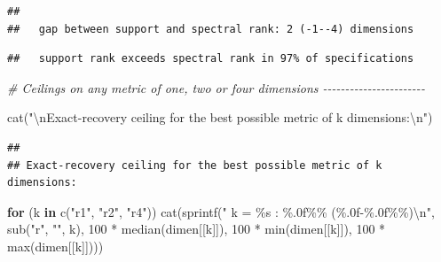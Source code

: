 \documentclass[
  11pt,
]{article}
\newenvironment{Shaded}{\begin{snugshade}}{\end{snugshade}}
\newcommand{\CommentTok}[1]{\textcolor[rgb]{0.56,0.35,0.01}{\textit{#1}}}
\newcommand{\ControlFlowTok}[1]{\textcolor[rgb]{0.13,0.29,0.53}{\textbf{#1}}}
\newcommand{\DecValTok}[1]{\textcolor[rgb]{0.00,0.00,0.81}{#1}}
\newcommand{\FunctionTok}[1]{\textcolor[rgb]{0.00,0.00,0.00}{#1}}
\newcommand{\NormalTok}[1]{#1}
\newcommand{\SpecialCharTok}[1]{\textcolor[rgb]{0.00,0.00,0.00}{#1}}
\newcommand{\StringTok}[1]{\textcolor[rgb]{0.31,0.60,0.02}{#1}}
\begin{document}
\begin{verbatim}
## 
##   gap between support and spectral rank: 2 (-1--4) dimensions
\end{verbatim}

\begin{Shaded}
\end{Shaded}

\begin{verbatim}
##   support rank exceeds spectral rank in 97% of specifications
\end{verbatim}

\begin{Shaded}
\begin{Highlighting}[]
\CommentTok{\# Ceilings on any metric of one, two or four dimensions {-}{-}{-}{-}{-}{-}{-}{-}{-}{-}{-}{-}{-}{-}{-}{-}{-}{-}{-}{-}{-}{-}{-}}

\FunctionTok{cat}\NormalTok{(}\StringTok{"}\SpecialCharTok{\textbackslash{}n}\StringTok{Exact{-}recovery ceiling for the best possible metric of k dimensions:}\SpecialCharTok{\textbackslash{}n}\StringTok{"}\NormalTok{)}
\end{Highlighting}
\end{Shaded}

\begin{verbatim}
## 
## Exact-recovery ceiling for the best possible metric of k dimensions:
\end{verbatim}

\begin{Shaded}
\begin{Highlighting}[]
\ControlFlowTok{for}\NormalTok{ (k }\ControlFlowTok{in} \FunctionTok{c}\NormalTok{(}\StringTok{"r1"}\NormalTok{, }\StringTok{"r2"}\NormalTok{, }\StringTok{"r4"}\NormalTok{))}
  \FunctionTok{cat}\NormalTok{(}\FunctionTok{sprintf}\NormalTok{(}\StringTok{"  k = \%s : \%.0f\%\% (\%.0f{-}\%.0f\%\%)}\SpecialCharTok{\textbackslash{}n}\StringTok{"}\NormalTok{, }\FunctionTok{sub}\NormalTok{(}\StringTok{"r"}\NormalTok{, }\StringTok{""}\NormalTok{, k),}
              \DecValTok{100} \SpecialCharTok{*} \FunctionTok{median}\NormalTok{(dimen[[k]]), }\DecValTok{100} \SpecialCharTok{*} \FunctionTok{min}\NormalTok{(dimen[[k]]), }\DecValTok{100} \SpecialCharTok{*} \FunctionTok{max}\NormalTok{(dimen[[k]])))}
\end{Highlighting}
\end{Shaded}
\end{document}
